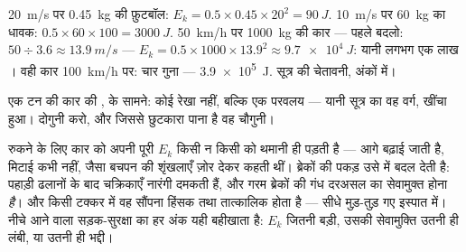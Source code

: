 \begin{example}[पहले हिसाब]\label{ex:g9:kinetic-energy-safety:first}
\qty{20}{m/s} पर \qty{0.45}{kg} की फ़ुटबॉल: $E_k = 0.5 \times 0.45
\times 20^2 = \qty{90}{J}$. \qty{10}{m/s} पर \qty{60}{kg} का धावक:
$0.5 \times 60 \times 100 = \qty{3000}{J}$. \qty{50}{km/h} पर
\qty{1000}{kg} की कार --- पहले बदलो: $50 \div 3.6 \approx
\qty{13.9}{m/s}$ --- $E_k = 0.5 \times 1000 \times 13.9^2 \approx
\qty{9.7e4}{J}$: यानी लगभग एक लाख । वही कार \qty{100}{km/h} पर:
चार गुना --- \qty{3.9e5}{J}. सूत्र की चेतावनी, अंकों में।
\end{example}

\begin{omfigure}

{\small एक टन की कार की ,  के सामने: कोई रेखा नहीं, बल्कि
एक परवलय --- यानी सूत्र का वह वर्ग, खींचा हुआ।  दोगुनी करो, और
जिससे छुटकारा पाना है वह  चौगुनी।}
\end{omfigure}

\begin{example}[ब्रेक उसे भेजते कहाँ हैं]\label{ex:g9:kinetic-energy-safety:brakes}
रुकने के लिए कार को अपनी पूरी $E_k$ किसी न किसी को थमानी ही पड़ती है
---  आगे बढ़ाई जाती है, मिटाई कभी नहीं, जैसा बचपन की शृंखलाएँ
ज़ोर देकर कहती थीं। ब्रेकों की पकड़ उसे  में बदल देती है: पहाड़ी
ढलानों के बाद चक्रिकाएँ नारंगी दमकती हैं, और गरम ब्रेकों की गंध दरअसल
 का सेवामुक्त होना \emph{है}। और किसी टक्कर में वह सौंपना
हिंसक तथा तात्कालिक होता है --- सीधे मुड़-तुड़ गए इस्पात में। नीचे आने
वाला सड़क-सुरक्षा का हर अंक यही बहीखाता है: $E_k$ जितनी बड़ी, उसकी
सेवामुक्ति उतनी ही लंबी, या उतनी ही भद्दी।
\end{example}

